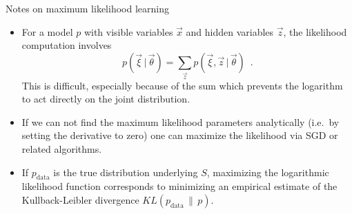 \begin{frame}{Notes on maximum likelihood learning}

 \begin{itemize}\itemsep2ex
 \item For a  model $p$ with visible variables $\vec x$ and
 hidden variables $\vec z$, the likelihood computation involves
 \[
     p(\vec \xi\,|\,\vec\theta) = \sum_{\vec z} p(\vec \xi,\vec z\,|\,\vec\theta)\enspace.
     \]
 This is difficult, especially because of the sum which prevents the logarithm to
 act directly on  the joint distribution. \pause
 \item If we  can not find the maximum likelihood parameters analytically (i.e.~by setting the derivative to zero) one can  maximize the likelihood via SGD or related algorithms.
 \item If $p_{\text{data}}$ is the true distribution underlying $S$, maximizing the
 logarithmic likelihood function corresponds to minimizing an
 empirical estimate of the Kullback-Leibler divergence
 $KL(p_{\text{data}}\,\|\,p)$.
 \end{itemize}
 \end{frame}





\endlecture

